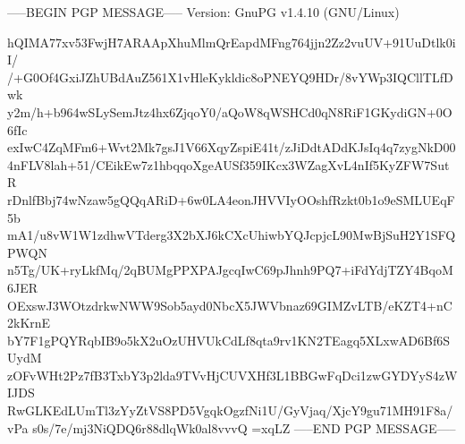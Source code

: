-----BEGIN PGP MESSAGE-----
Version: GnuPG v1.4.10 (GNU/Linux)

hQIMA77xv53FwjH7ARAApXhuMlmQrEapdMFng764jjn2Zz2vuUV+91UuDtlk0iI/
/+G0Of4GxiJZhUBdAuZ561X1vHleKykldic8oPNEYQ9HDr/8vYWp3IQCllTLfDwk
y2m/h+b964wSLySemJtz4hx6ZjqoY0/aQoW8qWSHCd0qN8RiF1GKydiGN+0O6fIc
exIwC4ZqMFm6+Wvt2Mk7gsJ1V66XqyZspiE41t/zJiDdtADdKJsIq4q7zygNkD00
4nFLV8lah+51/CEikEw7z1hbqqoXgeAUSf359IKcx3WZagXvL4nIf5KyZFW7SutR
rDnlfBbj74wNzaw5gQQqARiD+6w0LA4eonJHVVIyOOshfRzkt0b1o9eSMLUEqF5b
mA1/u8vW1W1zdhwVTderg3X2bXJ6kCXcUhiwbYQJcpjcL90MwBjSuH2Y1SFQPWQN
n5Tg/UK+ryLkfMq/2qBUMgPPXPAJgcqIwC69pJhnh9PQ7+iFdYdjTZY4BqoM6JER
OExswJ3WOtzdrkwNWW9Sob5ayd0NbcX5JWVbnaz69GIMZvLTB/eKZT4+nC2kKrnE
bY7F1gPQYRqbIB9o5kX2uOzUHVUkCdLf8qta9rv1KN2TEagq5XLxwAD6Bf6SUydM
zOFvWHt2Pz7fB3TxbY3p2lda9TVvHjCUVXHf3L1BBGwFqDci1zwGYDYyS4zWIJDS
RwGLKEdLUmTl3zYyZtVS8PD5VgqkOgzfNi1U/GyVjaq/XjcY9gu71MH91F8a/vPa
s0s/7e/mj3NiQDQ6r88dlqWk0al8vvvQ
=xqLZ
-----END PGP MESSAGE-----
